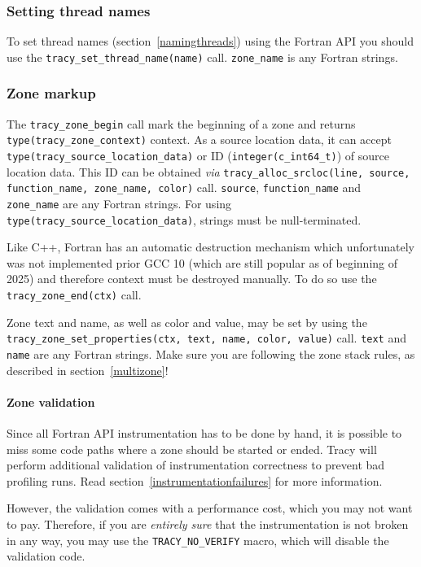 \documentclass[hidelinks,titlepage,a4paper,twoside]{article}
\begin{document}
\subsubsection{Setting thread names}

To set thread names (section~\ref{namingthreads}) using the Fortran API you should use the \texttt{tracy\_set\_thread\_name(name)} call.
\texttt{zone\_name} is any Fortran strings.

\subsubsection{Zone markup}

The \texttt{tracy\_zone\_begin} call mark the beginning of a zone and returns \texttt{type(tracy\_zone\_context)} context.
As a source location data, it can accept \texttt{type(tracy\_source\_location\_data)} or ID (\texttt{integer(c\_int64\_t)}) of source location data.
This ID can be obtained \textit{via} \texttt{tracy\_alloc\_srcloc(line, source, function\_name, zone\_name, color)} call.
\texttt{source}, \texttt{function\_name} and \texttt{zone\_name} are any Fortran strings.
For using \texttt{type(tracy\_source\_location\_data)}, strings must be null-terminated.

Like C++, Fortran has an automatic destruction mechanism which unfortunately was not implemented prior GCC 10 (which are still popular as of beginning of 2025) and therefore context must be destroyed manually.
To do so use the \texttt{tracy\_zone\_end(ctx)} call.

Zone text and name, as well as color and value, may be set by using the \texttt{tracy\_zone\_set\_properties(ctx, text, name, color, value)} call.
\texttt{text} and \texttt{name} are any Fortran strings.
Make sure you are following the zone stack rules, as described in section~\ref{multizone}!

\paragraph{Zone validation}

Since all Fortran API instrumentation has to be done by hand, it is possible to miss some code paths where a zone should be started or ended. Tracy will perform additional validation of instrumentation correctness to prevent bad profiling runs. Read section~\ref{instrumentationfailures} for more information.

However, the validation comes with a performance cost, which you may not want to pay. Therefore, if you are \emph{entirely sure} that the instrumentation is not broken in any way, you may use the \texttt{TRACY\_NO\_VERIFY} macro, which will disable the validation code.
\end{document}
